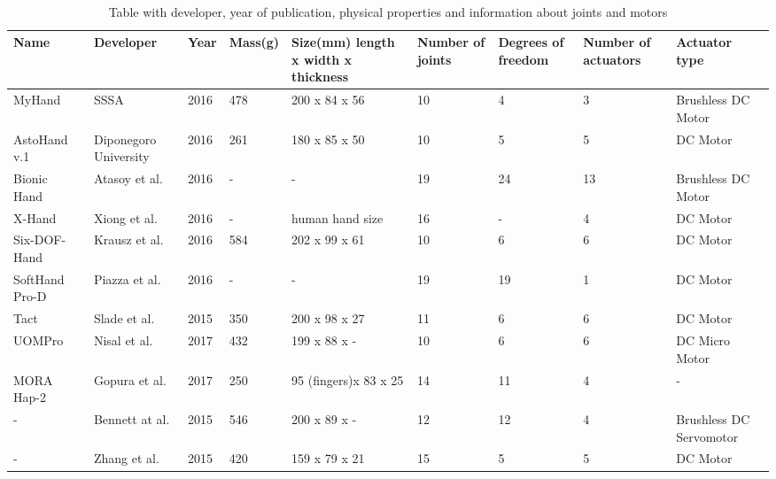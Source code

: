 \documentclass[a4paper, 10pt, conference]{ieeeconf}      %
\begin{document}
\newpage~\newpage

\hspace*{-1cm}
\begin{table}

\begin{tabular}{l|p{2cm}|p{1cm}|p{1.2cm}|p{2.2cm}|p{1.2cm}|p{1.2cm}|p{1.2cm}|p{2cm}}

Name & Developer & Year & Mass(g) & Size(mm) length x width x thickness & Number of joints & Degrees of freedom & Number of \newline actuators & Actuator type\\
\hline
MyHand~\cite{myhand} & SSSA & 2016 & 478 & 200 x 84 x 56 & 10 & 4 & 3 & Brushless DC Motor\\
\hline
AstoHand v.1~\cite{astohand} & Diponegoro University & 2016 & 261 & 180 x 85 x 50 & 10 & 5 & 5 & DC Motor\\
\hline
Bionic Hand~\cite{bionichand} & Atasoy et al. & 2016 & - & - & 19 & 24 & 13 & Brushless DC Motor\\
\hline
X-Hand~\cite{xhand}& Xiong et al. & 2016 & - & human hand size & 16 & - & 4 & DC Motor\\
\hline
Six-DOF-Hand~\cite{6dofhand} & Krausz et al. & 2016 & 584 & 202 x 99 x 61 & 10 & 6 & 6 & DC Motor\\
\hline
SoftHand Pro-D~\cite{softhand} & Piazza et al. & 2016 & - & - & 19 & 19 & 1 & DC Motor\\
\hline
Tact~\cite{tact} & Slade et al. & 2015 & 350 & 200 x 98 x 27 & 11 & 6 & 6 & DC Motor\\
\hline
UOMPro~\cite{uompro} & Nisal et al. & 2017 & 432 & 199 x 88 x - & 10 & 6 & 6 & DC Micro Motor\\
\hline
MORA Hap-2~\cite{morahap2} & Gopura et al. & 2017 & 250 & 95 (fingers)\newline x 83 x 25 & 14 & 11 & 4 & -\\
\hline
-~\cite{bennett} & Bennett at al. & 2015 & 546 & 200 x 89 x - & 12 & 12 & 4 & Brushless DC Servomotor\\
\hline
-~\cite{zhang} & Zhang et al. & 2015 & 420 & 159 x 79 x 21 & 15 & 5 & 5 & DC Motor\\

\end{tabular}

\caption{Table with developer, year of publication, physical properties and information about joints and motors}
\label{table:table1}

\end{table}
\end{document}
